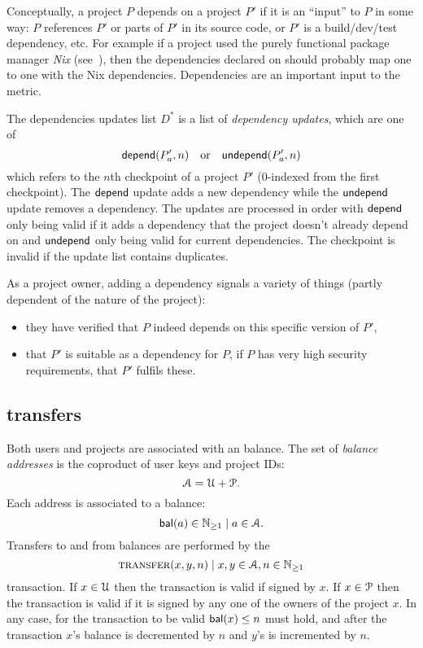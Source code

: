 \label{s:dependencies}
Conceptually, a project $P$ depends on a project $P'$ if it is an
``input'' to $P$ in some way: $P$ references $P'$ or parts of
$P'$ in its source code, or $P'$ is a build/dev/test dependency,
etc. For example if a project used the purely functional package
manager \emph{Nix} (see~\cite{nix}), then the dependencies declared on
\oscoin{} should probably map one to one with the Nix
dependencies. Dependencies are an important input to the \osrank{}
metric.

The dependencies updates list $D^*$ is a list of \emph{dependency
  updates}, which are one of
\[
    \mathsf{depend}(P'_a, n) \quad \text{or} \quad \mathsf{undepend}(P'_a, n)
\]
which refers to the $n$th checkpoint of a project $P'$ ($0$-indexed
from the first checkpoint). The $\mathsf{depend}$ update adds a new dependency
while the $\mathsf{undepend}$ update removes a dependency. The updates are
processed in order with $\mathsf{depend}$ only being valid if it adds a
dependency that the project doesn't already depend on and $\mathsf{undepend}$
only being valid for current dependencies. The checkpoint is invalid
if the update list contains duplicates.

As a project owner, adding a dependency signals a variety of things
(partly dependent of the nature of the project):
\begin{itemize}
\item they have verified that $P$ indeed depends on this specific
  version of $P'$,
\item that $P'$ is suitable as a dependency for $P$, \eg{} if $P$ has
  very high security requirements, that $P'$ fulfils these.
\end{itemize}


\def\posnat{\mathbb{N}_{\geq 1}}

\subsection{\oscoin{} transfers}

Both users and projects are associated with an \oscoin{} balance.  The
set of \emph{balance addresses} is the coproduct of user keys and
project IDs:
\[
\mathcal{A} = \mathcal{U} + \mathcal{P}.
\]
Each address is associated to a balance:
\[
\bal(a) \in \posnat \mid a \in \accAddrs.
\]
Transfers to and from balances are performed by the
\[
\text{\normalfont\scshape transfer}\small{\lparen x,y,n\rparen} \mid x,y \in \mathcal{A}, n \in \mathbb{N}_{\geq 1}
\]
transaction. If $x \in \mathcal{U}$ then the transaction is valid if signed
by $x$. If $x \in \mathcal{P}$ then the transaction is valid if it is
signed by any one of the owners of the project $x$. In any case, for
the transaction to be valid $\mathsf{bal}(x) \leq n$ must hold, and after the
transaction $x$'s balance is decremented by $n$ and $y$'s is
incremented by $n$.

